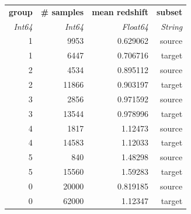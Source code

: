 \begin{tabular}{|r|r|r|r|}
  \hline
  \textbf{group} & \textbf{\# samples} & \textbf{mean redshift} & \textbf{subset} \\
  \textit{Int64} & \textit{Int64} & \textit{Float64} & \textit{String} \\
  \hline
  1 & 9953 & 0.629062 & source \\
  1 & 6447 & 0.706716 & target \\
  2 & 4534 & 0.895112 & source \\
  2 & 11866 & 0.903197 & target \\
  3 & 2856 & 0.971592 & source \\
  3 & 13544 & 0.978996 & target \\
  4 & 1817 & 1.12473 & source \\
  4 & 14583 & 1.12033 & target \\
  5 & 840 & 1.48298 & source \\
  5 & 15560 & 1.59283 & target \\
  0 & 20000 & 0.819185 & source \\
  0 & 62000 & 1.12347 & target \\
  \hline
\end{tabular}
